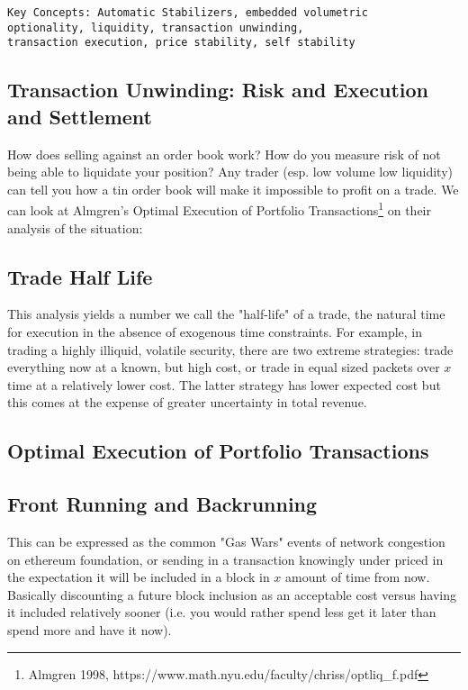 \begin{verbatim}
Key Concepts: Automatic Stabilizers, embedded volumetric
optionality, liquidity, transaction unwinding, 
transaction execution, price stability, self stability
 \end{verbatim}
    \vspace{2mm}

\subsection{Transaction Unwinding: Risk and Execution and Settlement}

How does selling against an order book work? How do you measure risk of not being able to liquidate your position? Any
trader (esp. low volume
low liquidity) can tell you how a tin order book will make it 
impossible to profit on a trade. We can look at Almgren's Optimal 
Execution of Portfolio Transactions\footnote{Almgren 1998, https://www.math.nyu.edu/faculty/chriss/optliq_f.pdf} on
their analysis of the situation:
    \vspace{2mm}
\subsection{Trade Half Life}
This analysis yields a number we call the "half-life" of a trade, the 
natural time for execution in the absence of exogenous time 
constraints. For example, in trading a highly illiquid, volatile 
security, there are two extreme strategies: trade everything now at a 
known, but high cost, or trade in equal sized packets over $x$ time 
at a relatively lower cost. The latter strategy has lower expected cost but this comes at the expense of greater
uncertainty in total revenue.
    \vspace{2mm}
\subsection{Optimal Execution of Portfolio Transactions}
    \vspace{2mm}
\subsection{Front Running and Backrunning}
This can be expressed as the common "Gas Wars" events of network 
congestion on ethereum foundation, or sending in a transaction knowingly under priced in the expectation it will be
included in a block in $x$ amount of time from now. Basically discounting a future 
block inclusion as an acceptable cost versus having it included relatively sooner (i.e. you would rather spend less get
it later than 
spend more and have it now).

